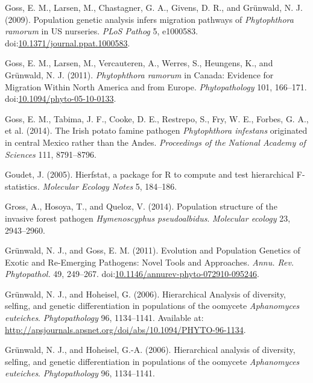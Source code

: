 \documentclass[double,12pt]{beavtex}
\begin{document}
  \hypertarget{ref-goss2009population}{}
  Goss, E. M., Larsen, M., Chastagner, G. A., Givens, D. R., and Grünwald,
  N. J. (2009). Population genetic analysis infers migration pathways of
  \emph{Phytophthora ramorum} in US nurseries. \emph{PLoS Pathog} 5,
  e1000583.
  doi:\href{https://doi.org/10.1371/journal.ppat.1000583}{10.1371/journal.ppat.1000583}.
  
  \hypertarget{ref-goss2011phytophthora}{}
  Goss, E. M., Larsen, M., Vercauteren, A., Werres, S., Heungens, K., and
  Grünwald, N. J. (2011). \emph{Phytophthora ramorum} in Canada: Evidence
  for Migration Within North America and from Europe.
  \emph{Phytopathology} 101, 166--171.
  doi:\href{https://doi.org/10.1094/phyto-05-10-0133}{10.1094/phyto-05-10-0133}.
  
  \hypertarget{ref-goss2014irish}{}
  Goss, E. M., Tabima, J. F., Cooke, D. E., Restrepo, S., Fry, W. E.,
  Forbes, G. A., et al. (2014). The Irish potato famine pathogen
  \emph{Phytophthora infestans} originated in central Mexico rather than
  the Andes. \emph{Proceedings of the National Academy of Sciences} 111,
  8791--8796.
  
  \hypertarget{ref-goudet2005hierfstat}{}
  Goudet, J. (2005). Hierfstat, a package for R to compute and test
  hierarchical F-statistics. \emph{Molecular Ecology Notes} 5, 184--186.
  
  \hypertarget{ref-gross2014population}{}
  Gross, A., Hosoya, T., and Queloz, V. (2014). Population structure of
  the invasive forest pathogen \emph{Hymenoscyphus pseudoalbidus}.
  \emph{Molecular ecology} 23, 2943--2960.
  
  \hypertarget{ref-grunwald2011evolution}{}
  Grünwald, N. J., and Goss, E. M. (2011). Evolution and Population
  Genetics of Exotic and Re-Emerging Pathogens: Novel Tools and
  Approaches. \emph{Annu. Rev. Phytopathol.} 49, 249--267.
  doi:\href{https://doi.org/10.1146/annurev-phyto-072910-095246}{10.1146/annurev-phyto-072910-095246}.
  
  \hypertarget{ref-Grunwald:2006}{}
  Grünwald, N. J., and Hoheisel, G. (2006). Hierarchical Analysis of
  diversity, selfing, and genetic differentiation in populations of the
  oomycete \emph{Aphanomyces euteiches}. \emph{Phytopathology} 96,
  1134--1141. Available at:
  \url{http://apsjournals.apsnet.org/doi/abs/10.1094/PHYTO-96-1134}.
  
  \hypertarget{ref-grunwald2006hierarchical}{}
  Grünwald, N. J., and Hoheisel, G.-A. (2006). Hierarchical analysis of
  diversity, selfing, and genetic differentiation in populations of the
  oomycete \emph{Aphanomyces euteiches}. \emph{Phytopathology} 96,
  1134--1141.
  
\end{document}
